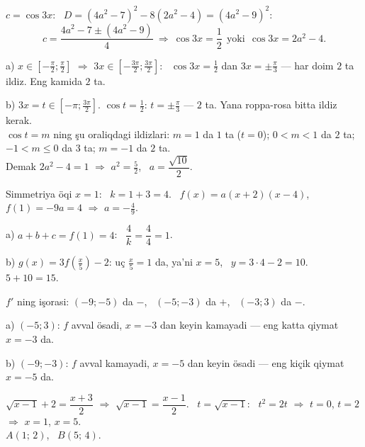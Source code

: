 \newpage
{}
$c=\cos3x$: \ $D=\left(4a^2-7\right)^2-8\left(2a^2-4\right)=\left(4a^2-9\right)^2$:
\[c=\frac{4a^2-7\pm\left(4a^2-9\right)}4\ \Rightarrow\ \cos3x=\frac12\ \ \text{yoki}\ \ \cos3x=2a^2-4.\]

a) $x\in\left[-\frac\pi2;\frac\pi2\right]$ $\Rightarrow$ $3x\in\left[-\frac{3\pi}2;\frac{3\pi}2\right]$: \ $\cos3x=\frac12$ dan $3x=\pm\frac\pi3$ — har doim $2$ ta ildiz. Eng kamida $2$ ta.

b) $3x=t\in\left[-\pi;\frac{3\pi}2\right]$. $\cos t=\frac12$: $t=\pm\frac\pi3$ — $2$ ta. Yana roppa-rosa bitta ildiz kerak.\\
$\cos t=m$ ning şu oraliqdagi ildizlari: $m=1$ da $1$ ta ($t=0$); $0<m<1$ da $2$ ta; $-1<m\le0$ da $3$ ta; $m=-1$ da $2$ ta.\\
Demak $2a^2-4=1$ $\Rightarrow$ $a^2=\frac52$, \ $a=\dfrac{\sqrt{10}}2$.

\newpage
{}
Simmetriya öqi $x=1$: \ $k=1+3=4$. \ $f(x)=a(x+2)(x-4)$, \ $f(1)=-9a=4$ $\Rightarrow$ $a=-\frac49$.

a) $a+b+c=f(1)=4$: \ $\dfrac4k=\dfrac44=1$.

b) $g(x)=3f\left(\frac x5\right)-2$: uç $\frac x5=1$ da, ya'ni $x=5$, \ $y=3\cdot4-2=10$. \ $5+10=15$.

\newpage
{}
$f'$ ning işorasi: $(-9;-5)$ da $-$, \ $(-5;-3)$ da $+$, \ $(-3;3)$ da $-$.

a) $(-5;3)$: $f$ avval ösadi, $x=-3$ dan keyin kamayadi — eng katta qiymat $x=-3$ da.

b) $(-9;-3)$: $f$ avval kamayadi, $x=-5$ dan keyin ösadi — eng kiçik qiymat $x=-5$ da.

\newpage
{}
$\sqrt{x-1}+2=\dfrac{x+3}2$ $\Rightarrow$ $\sqrt{x-1}=\dfrac{x-1}2$. \ $t=\sqrt{x-1}$: \ $t^2=2t$ $\Rightarrow$ $t=0$, $t=2$ $\Rightarrow$ $x=1$, $x=5$.\\
$A(1;\,2)$, \ $B(5;\,4)$.

